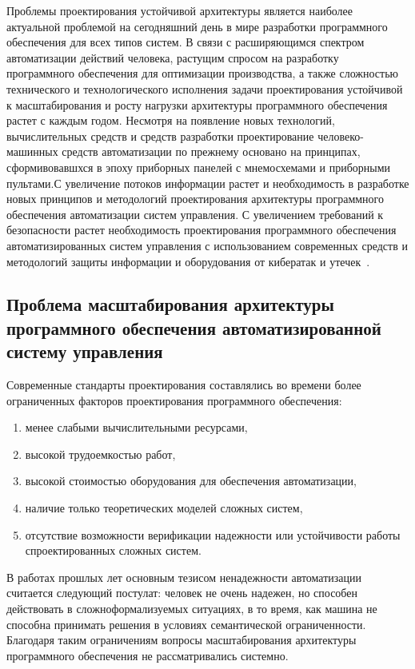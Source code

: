 Проблемы проектирования устойчивой архитектуры является наиболее актуальной проблемой на сегодняшний день в мире разработки программного обеспечения для всех типов систем. В связи с расширяющимся спектром автоматизации действий человека, растущим спросом на разработку программного обеспечения для оптимизации производства, а также сложностью технического и технологического исполнения задачи проектирования устойчивой к масштабирования и росту нагрузки архитектуры программного обеспечения растет с каждым годом.
Несмотря на появление новых технологий, вычислительных средств и средств разработки проектирование человеко-машинных средств автоматизации по прежнему основано на принципах, сформивовавшхся в эпоху приборных панелей с мнемосхемами и приборными пультами.С увеличение потоков информации растет и необходимость в разработке новых принципов и методологий проектирования архитектуры программного обеспечения автоматизации систем управления. С увеличением требований к безопасности растет необходимость проектирования программного обеспечения автоматизированных систем управления с использованием современных средств и методологий защиты информации и оборудования от кибератак и утечек~\cite{Ref60, Ref61, Ref62, Ref63,Ref64,ISA}. 

\subsection{Проблема масштабирования архитектуры программного обеспечения автоматизированной систему управления}\label{subsec:ch1/sec4/sub2}
Современные стандарты проектирования составлялись во времени более ограниченных факторов проектирования программного обеспечения:
\begin{enumerate}
    \item  менее слабыми вычислительными ресурсами,
    \item  высокой трудоемкостью работ,
    \item  высокой стоимостью оборудования для обеспечения автоматизации,
    \item  наличие только теоретических моделей сложных систем,
    \item  отсутствие возможности верификации надежности или устойчивости работы спроектированных сложных систем.
\end{enumerate}
В работах прошлых лет основным тезисом ненадежности автоматизации считается следующий постулат: человек не очень надежен, но способен действовать в сложноформализуемых ситуациях, в то время, как машина не способна принимать решения в условиях семантической ограниченности.
Благодаря таким ограничениям вопросы масштабирования архитектуры программного обеспечения не рассматривались системно.

